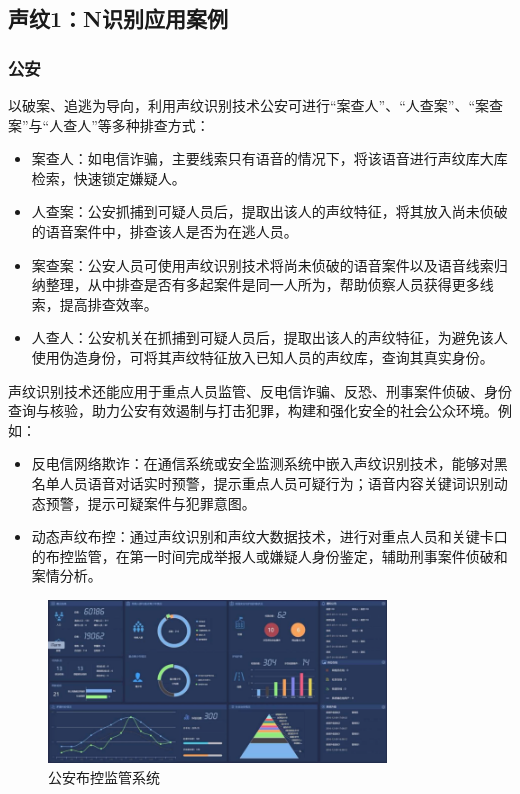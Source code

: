 \subsection{声纹1：N识别应用案例}
\subsubsection{公安}
以破案、追逃为导向，利用声纹识别技术公安可进行“案查人”、“人查案”、“案查案”与“人查人”等多种排查方式：
\begin{itemize}
	\item 案查人：如电信诈骗，主要线索只有语音的情况下，将该语音进行声纹库大库检索，快速锁定嫌疑人。
	\item 人查案：公安抓捕到可疑人员后，提取出该人的声纹特征，将其放入尚未侦破的语音案件中，排查该人是否为在逃人员。
	\item 案查案：公安人员可使用声纹识别技术将尚未侦破的语音案件以及语音线索归纳整理，从中排查是否有多起案件是同一人所为，帮助侦察人员获得更多线索，提高排查效率。
	\item 人查人：公安机关在抓捕到可疑人员后，提取出该人的声纹特征，为避免该人使用伪造身份，可将其声纹特征放入已知人员的声纹库，查询其真实身份。
\end{itemize}

声纹识别技术还能应用于重点人员监管、反电信诈骗、反恐、刑事案件侦破、身份查询与核验，助力公安有效遏制与打击犯罪，构建和强化安全的社会公众环境。例如：
\begin{itemize}
	\item 反电信网络欺诈：在通信系统或安全监测系统中嵌入声纹识别技术，能够对黑名单人员语音对话实时预警，提示重点人员可疑行为；语音内容关键词识别动态预警，提示可疑案件与犯罪意图。
	\item 动态声纹布控：通过声纹识别和声纹大数据技术，进行对重点人员和关键卡口的布控监管，在第一时间完成举报人或嫌疑人身份鉴定，辅助刑事案件侦破和案情分析。
\end{itemize}

\begin{figure}[h!]
	\begin{center}
		\includegraphics[width=0.8\textwidth]{img/chapter_voiceprint/vpr_app6.png}
		\caption{公安布控监管系统}
		\label{pic:vprapp6}
	\end{center}
\end{figure}

